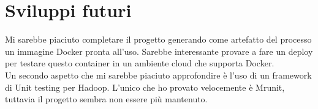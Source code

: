 \documentclass[paper=a4, fontsize=11pt]{scrartcl}	%
\numberwithin{equation}{section}															%
\numberwithin{figure}{section}																%
\numberwithin{table}{section}																%
\begin{document}
\section{Sviluppi futuri}
Mi sarebbe piaciuto completare il progetto generando come artefatto del processo un immagine Docker pronta all'uso. Sarebbe interessante provare a fare un deploy per testare questo container in un ambiente cloud che supporta Docker.\\
Un secondo aspetto che mi sarebbe piaciuto approfondire è l'uso di un framework di Unit testing per Hadoop. L'unico che ho provato velocemente è Mrunit, tuttavia il progetto sembra non essere più mantenuto.
\end{document}
